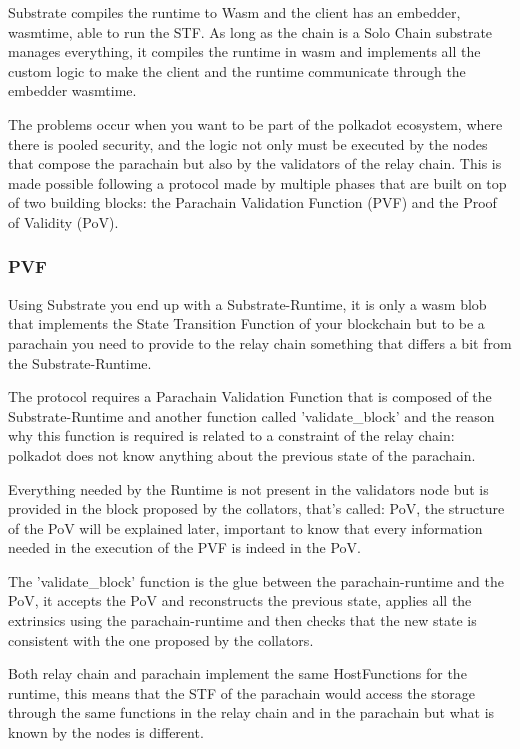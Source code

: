 \documentclass[../main.tex]{subfiles}
\begin{document}
Substrate compiles the runtime to Wasm and the client has an embedder, wasmtime, able to run the STF. As long as the chain is a Solo Chain substrate manages everything, it compiles the runtime in wasm and implements all the custom logic to make the client and the runtime communicate through the embedder wasmtime.

The problems occur when you want to be part of the polkadot ecosystem, where there is pooled security, and the logic not only must be executed by the nodes that compose the parachain but also by the validators of the relay chain. This is made possible following a protocol made by multiple phases that are built on top of two building blocks: the Parachain Validation Function (PVF) and the Proof of Validity (PoV).~\cite{parachain-protocol}

\subsubsection{PVF}

Using Substrate you end up with a Substrate-Runtime, it is only a wasm blob that implements the State Transition Function of your blockchain but to be a parachain you need to provide to the relay chain something that differs a bit from the Substrate-Runtime.

The protocol requires a Parachain Validation Function that is composed of the Substrate-Runtime and another function called 'validate\_block' and the reason why this function is required is related to a constraint of the relay chain: polkadot does not know anything about the previous state of the parachain.

Everything needed by the Runtime is not present in the validators node but is provided in the block proposed by the collators, that's called: PoV, the structure of the PoV will be explained later, important to know that every information needed in the execution of the PVF is indeed in the PoV.

The 'validate\_block' function is the glue between the parachain-runtime and the PoV, it accepts the PoV and reconstructs the previous state, applies all the extrinsics using the parachain-runtime and then checks that the new state is consistent with the one proposed by the collators.

Both relay chain and parachain implement the same HostFunctions for the runtime, this means that the STF of the parachain would access the storage through the same functions in the relay chain and in the parachain but what is known by the nodes is different.
\end{document}

